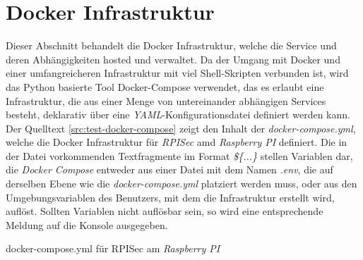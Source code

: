 \section{Docker Infrastruktur}
Dieser Abschnitt behandelt die Docker Infrastruktur, welche die Service und deren Abhängigkeiten hosted und verwaltet. Da der Umgang mit Docker und einer umfangreicheren Infrastruktur mit viel Shell-Skripten verbunden ist, wird das Python basierte Tool Docker-Compose verwendet, das es erlaubt eine Infrastruktur, die aus einer Menge von untereinander abhängigen Services besteht, deklarativ über eine \emph{YAML}-Konfigurationsdatei definiert werden kann. 
\newline
\newline
Der Quelltext \ref{src:test-docker-compose} zeigt den Inhalt der \emph{docker-compose.yml}, welche die Docker Infrastruktur für \emph{RPISec} amd \emph{Raspberry PI} definiert. Die in der Datei vorkommenden Textfragmente im Format \emph{\$\{...\}} stellen Variablen dar, die \emph{Docker Compose} entweder aus einer Datei mit dem Namen \emph{.env}, die auf derselben Ebene wie die \emph{docker-compose.yml} platziert werden muss, oder aus den Umgebungsvariablen des Benutzers, mit dem die Infrastruktur erstellt wird, auflöst. Sollten Variablen nicht auflösbar sein, so wird eine entsprechende Meldung auf die Konsole ausgegeben.
\begin{code}
	\caption{docker-compose.yml für RPISec am \emph{Raspberry PI}}
	\label{src:test-docker-compose}
\end{code}